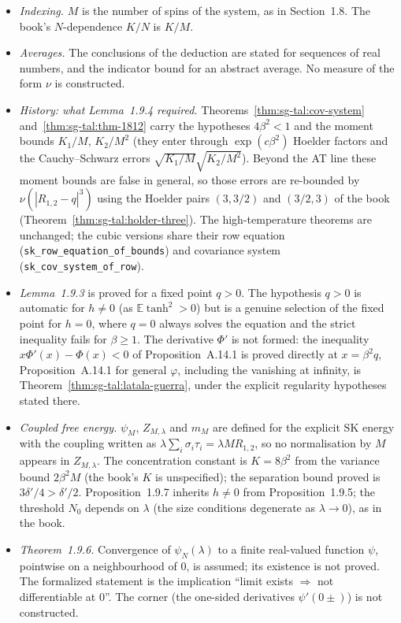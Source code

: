\begin{remark}
\label{rem:sg-tal:dev-19}
\begin{itemize}
\item \emph{Indexing.} $M$ is the number of spins of the system, as in Section~1.8.  The book's $N$-dependence $K/N$ is $K/M$.
\item \emph{Averages.} The conclusions of the deduction are stated for sequences of real numbers, and the indicator bound for an abstract average.  No measure of the form $\nu$ is constructed.
\item \emph{History: what Lemma~1.9.4 required.} Theorems~\ref{thm:sg-tal:cov-system} and~\ref{thm:sg-tal:thm-1812} carry the hypotheses $4\beta^2<1$ and the moment bounds $K_1/M$, $K_2/M^2$ (they enter through $\exp(c\beta^2)$ Hoelder factors and the Cauchy--Schwarz errors $\sqrt{K_1/M}\sqrt{K_2/M^2}$).  Beyond the AT line these moment bounds are false in general, so those errors are re-bounded by $\nu(|R_{1,2}-q|^3)$ using the Hoelder pairs $(3,3/2)$ and $(3/2,3)$ of the book (Theorem~\ref{thm:sg-tal:holder-three}).  The high-temperature theorems are unchanged; the cubic versions share their row equation (\texttt{sk\_row\_equation\_of\_bounds}) and covariance system (\texttt{sk\_cov\_system\_of\_row}).
\item \emph{Lemma~1.9.3} is proved for a fixed point $q>0$.  The hypothesis $q>0$ is automatic for $h\ne0$ (as $\mathbb E\tanh^2>0$) but is a genuine selection of the fixed point for $h=0$, where $q=0$ always solves the equation and the strict inequality fails for $\beta\ge1$.  The derivative $\Phi'$ is not formed: the inequality $x\Phi'(x)-\Phi(x)<0$ of Proposition~A.14.1 is proved directly at $x=\beta^2q$, Proposition~A.14.1 for general $\varphi$, including the vanishing at infinity, is Theorem~\ref{thm:sg-tal:latala-guerra}, under the explicit regularity hypotheses stated there.
\item \emph{Coupled free energy.} $\psi_M$, $Z_{M,\lambda}$ and $m_M$ are defined for the explicit SK energy with the coupling written as
$\lambda\sum_i\sigma_i\tau_i=\lambda MR_{1,2}$, so no normalisation by $M$ appears in $Z_{M,\lambda}$.  The concentration constant is $K=8\beta^2$
from the variance bound $2\beta^2M$ (the book's $K$ is unspecified); the separation bound proved is $3\delta'/4>\delta'/2$.  Proposition~1.9.7 inherits
$h\ne0$ from Proposition~1.9.5; the threshold $N_0$ depends on $\lambda$ (the size conditions degenerate as $\lambda\to0$), as in the book.
\item \emph{Theorem~1.9.6.} Convergence of $\psi_N(\lambda)$ to a finite real-valued function $\psi$, pointwise on a neighbourhood of $0$, is assumed; its existence is not proved. The formalized statement is the implication ``limit exists $\Rightarrow$ not differentiable at $0$''.  The corner (the one-sided derivatives $\psi'(0\pm)$) is not constructed.

\end{itemize}
\end{remark}
